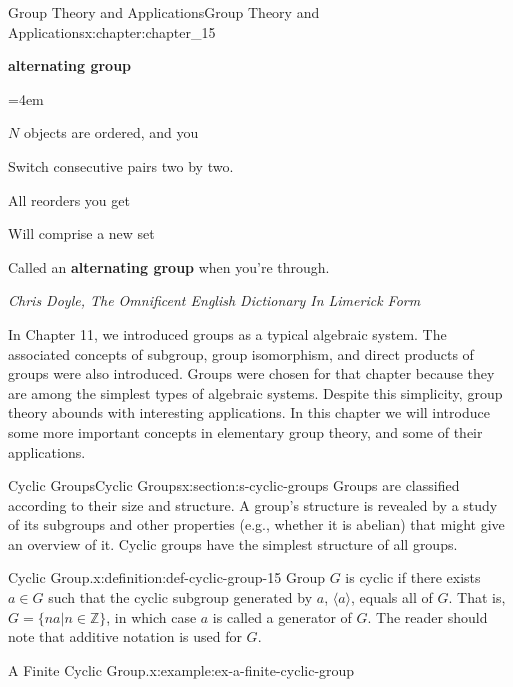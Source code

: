 \documentclass[twoside,10pt,]{book}
\newcommand{\terminology}[1]{\textbf{#1}}
\numberwithin{equation}{section}
\newenvironment{poem}{\setlength{\parindent}{0em}}{}
\newcommand{\poemTitle}[1]{\begin{center}\large\textbf{#1}\end{center}}
\newenvironment{stanza}{\vspace{0.25 em}\hangindent=4em}{\vspace{1 em}}
\newcommand{\poemauthorleft}[1]{\vspace{-1em}\begin{flushleft}\textit{#1}\end{flushleft}}
\newcommand{\poemlineleft}[1]{{\raggedright{#1}\par}\vspace{-\parskip}}
\begin{document}
%
%
\typeout{************************************************}
\typeout{************************************************}
%
\begin{chapterptx}{Group Theory and Applications}{}{Group Theory and Applications}{}{}{x:chapter:chapter_15}
\begin{introduction}{}%
\begin{poem}%
\poemTitle{alternating group}
\begin{stanza}
\poemlineleft{\(N\) objects are ordered, and you}
\poemlineleft{Switch consecutive pairs two by two.}
\poemlineleft{All reorders you get}
\poemlineleft{Will comprise a new set}
\poemlineleft{Called an \terminology{alternating group} when you're through.}
\end{stanza}
\poemauthorleft{Chris Doyle, The Omnificent English Dictionary In Limerick Form}
\end{poem}
In Chapter 11, we introduced groups as a typical algebraic system. The associated concepts of subgroup, group isomorphism, and direct products of groups were also introduced. Groups were chosen for that chapter because they are among the simplest types of algebraic systems. Despite this simplicity, group theory abounds with interesting applications. In this chapter we will introduce some more important concepts in elementary group theory, and some of their applications.%
\end{introduction}%
%
%
\typeout{************************************************}
\typeout{************************************************}
%
\begin{sectionptx}{Cyclic Groups}{}{Cyclic Groups}{}{}{x:section:s-cyclic-groups}
Groups are classified according to their size and structure. A group's structure is revealed by a study of its subgroups and other properties (e.g., whether it is abelian) that might give an overview of it. Cyclic groups have the simplest structure of all groups.%
\begin{definition}{Cyclic Group.}{x:definition:def-cyclic-group-15}%
%
\label{g:notation:idm404599517328}%
Group \(G\) is cyclic if there exists \(a \in  G\) such that the cyclic subgroup generated by \(a\), \(\langle a \rangle\), equals all of \(G\). That is, \(G = \{n a |n \in  \mathbb{Z}\}\), in which case \(a\) is called a generator of \(G\). The reader should note that additive notation is used for \(G\).%
\end{definition}
\begin{example}{A Finite Cyclic Group.}{x:example:ex-a-finite-cyclic-group}%

\end{example}
\end{sectionptx}
\end{chapterptx}
\end{document}
